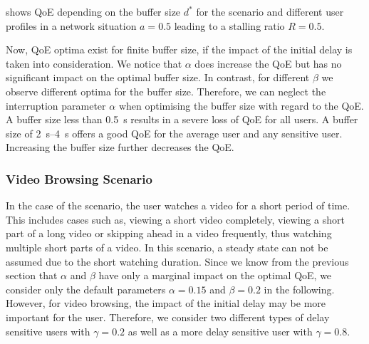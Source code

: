  shows \gls{QoE} depending on the buffer size \(d^*\) for the \watchNow scenario and different user profiles in a network situation \(a=0.5\) leading to a stalling ratio \(R=0.5\).

Now, \gls{QoE} optima exist for finite buffer size, if the impact of the initial delay is taken into consideration. 
We notice that \(\alpha\) does increase the \gls{QoE} but has no significant impact on the optimal buffer size.
In contrast, for different \(\beta\) we observe different optima for the buffer size.
Therefore, we can neglect the interruption parameter \(\alpha\) when optimising the buffer size with regard to the \gls{QoE}.
A buffer size less than \SI{0.5}{\second} results in a severe loss of \gls{QoE} for all users.
A buffer size of \SIrange{2}{4}{\second} offers a good \gls{QoE} for the average user and any sensitive user.
Increasing the buffer size further decreases the \gls{QoE}.

\subsubsection*{Video Browsing Scenario}\label{sec:application:qoe_user_behaviour:typical_user_scenarios:browsing}

In the case of the \videoBrowsing scenario, the user watches a video for a short period of time. This includes cases such as, viewing a short video completely, viewing a short part of a long video or skipping ahead in a video frequently, thus watching multiple short parts of a video.
In this scenario, a steady state can not be assumed due to the short watching duration.
Since we know from the previous section that \(\alpha\) and \(\beta\) have only a marginal impact on the optimal \gls{QoE}, we consider only the default parameters \(\alpha=0.15\) and \(\beta=0.2\) in the following.
However, for video browsing, the impact of the initial delay may be more important for the user. Therefore, we consider two different types of delay sensitive users with \(\gamma=0.2\) as well as a more delay sensitive user with \(\gamma=0.8\).

